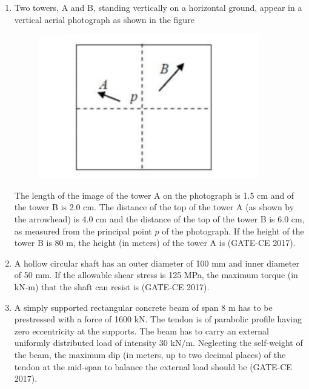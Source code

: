 \documentclass[journal,12pt,onecolumn]{article}
\theoremstyle{remark}
\begin{document}
\begin{enumerate}
    \item Two towers, A and B, standing vertically on a horizontal ground, appear in a vertical aerial photograph as shown in the figure 
    \begin{figure}[H]
    \centering
    \includegraphics[width=0.7\columnwidth]{figs/q38.jpg}  
    \caption{}
    \label{fig:10}
    \end{figure}
    The length of the image of the tower A on the photograph is 1.5 cm and of the tower B is 2.0 cm. The distance of the top of the tower A (as shown by the arrowhead) is 4.0 cm and the distance of the top of the tower B is 6.0 cm, as measured from the principal point $ p $ of the photograph. If the height of the tower B is 80 m, the height (in meters) of the tower A is \underline{\hspace{3cm}} \hfill (GATE-CE 2017).

    \item A hollow circular shaft has an outer diameter of 100 mm and inner diameter of 50 mm. If the allowable shear stress is 125 MPa, the maximum torque (in kN-m) that the shaft can resist is \underline{\hspace{3cm}} \hfill (GATE-CE 2017).

    \item A simply supported rectangular concrete beam of span 8 m has to be prestressed with a force of 1600 kN. The tendon is of parabolic profile having zero eccentricity at the supports. The beam has to carry an external uniformly distributed load of intensity 30 kN/m. Neglecting the self-weight of the beam, the maximum dip (in meters, up to two decimal places) of the tendon at the mid-span to balance the external load should be \underline{\hspace{3cm}} \hfill (GATE-CE 2017).


\end{enumerate}
\end{document}
